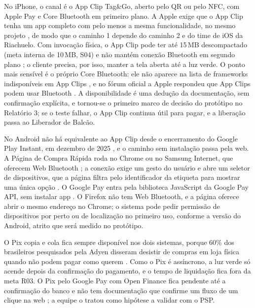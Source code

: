 No iPhone, o canal é o App Clip Tag\&Go, aberto pelo QR ou pelo NFC, com Apple Pay e Core Bluetooth em primeiro plano. A Apple exige que o App Clip tenha um app completo com pelo menos a mesma funcionalidade, no mesmo projeto \cite{apple2026appclipcriar}, de modo que o caminho 1 depende do caminho 2 e do time de iOS da Riachuelo. Com invocação física, o App Clip pode ter até 15\,MB descompactado \cite{apple2026tamanhos} (meta interna de 10\,MB, S04) e não mantém conexão Bluetooth em segundo plano \cite{apple2020forumble}; o cliente precisa, por isso, manter a tela aberta até a luz verde. O ponto mais sensível é o próprio Core Bluetooth: ele não aparece na lista de frameworks indisponíveis em App Clips \cite{apple2026appclipfuncoes}, e no fórum oficial a Apple respondeu que App Clips podem usar Bluetooth \cite{apple2020forumble}. A disponibilidade é uma dedução da documentação, sem confirmação explícita, e tornou-se o primeiro marco de decisão do protótipo no Relatório 3; se o teste falhar, o App Clip continua útil para pagar, e a liberação passa ao Liberador de Balcão.

No Android não há equivalente ao App Clip desde o encerramento do Google Play Instant, em dezembro de 2025 \cite{google2026instant}, e o caminho sem instalação passa pela web. A Página de Compra Rápida roda no Chrome ou no Samsung Internet, que oferecem Web Bluetooth \cite{caniuse2026webbluetooth}; a conexão exige um gesto do usuário e abre um seletor de dispositivos, que a página filtra pelo identificador da etiqueta para mostrar uma única opção \cite{chrome2026webbluetooth}. O Google Pay entra pela biblioteca JavaScript da Google Pay API, sem instalar app \cite{google2026paywebvisao}. O Firefox não tem Web Bluetooth, e a página oferece abrir o mesmo endereço no Chrome; o sistema pode pedir permissão de dispositivos por perto ou de localização no primeiro uso, conforme a versão do Android, atrito que será medido no protótipo.

O Pix copia e cola fica sempre disponível nos dois sistemas, porque 60\% dos brasileiros pesquisados pela Adyen disseram desistir de compras em loja física quando não podem pagar como querem \cite{tiinside2026adyen}. Como o Pix é assíncrono, a luz verde só acende depois da confirmação do pagamento, e o tempo de liquidação fica fora da meta R03. O Pix pelo Google Pay com Open Finance fica pendente até a confirmação do banco e não tem documentação que confirme um fluxo de um clique na web \cite{yuno2026googlepaypix}; a equipe o tratou como hipótese a validar com o PSP.

